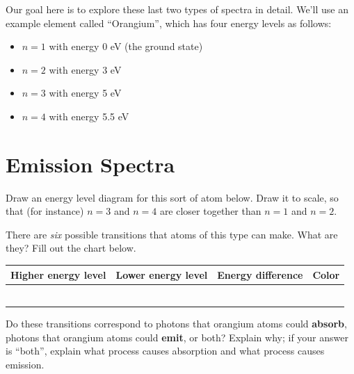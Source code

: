 \documentclass[12pt]{article}
\begin{document}
Our goal here is to explore these last two types of spectra in detail. We'll use an example element called ``Orangium'', which has four energy levels as follows:

\begin{itemize}
	\setlength\itemsep{0in}
	\item $n=1$ with energy 0 eV (the ground state)
	\item $n=2$ with energy 3 eV 
	\item $n=3$ with energy 5 eV 
	\item $n=4$ with energy 5.5 eV 
\end{itemize}



\newpage

\section{Emission Spectra}


Draw an energy level diagram for this sort of atom below. Draw it to scale, so that (for instance) $n=3$ and $n=4$ are closer together than $n=1$ and $n=2$. 

\vspace{3in}

There are {\it six} possible transitions that atoms of this type can make. What are they? Fill out the chart below.

\begin{center}
	
	\Large

\begin{tabular}{|c|c|c|c|}
	\hline
	\normalsize Higher energy level &\normalsize Lower energy level & \normalsize Energy difference & \normalsize\hspace{1cm}Color\hspace{1cm} \\
	\hline
	& & & \\
	\hline
		& & & \\
	\hline
			& & & \\
	\hline
			& & & \\
	\hline
			& & & \\
	\hline
			& & & \\
	\hline
\end{tabular}
\end{center}

Do these transitions correspond to photons that orangium atoms could {\bf absorb}, photons that orangium atoms could {\bf emit}, or both? Explain why; if your answer is ``both'', explain what process causes absorption and what process causes emission.
\end{document}
